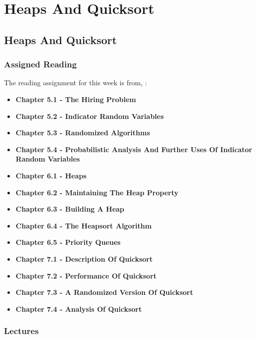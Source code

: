 \clearpage

\renewcommand{\ChapTitle}{Heaps And Quicksort}
\renewcommand{\SectionTitle}{Heaps And Quicksort}

\chapter{\ChapTitle}

\section{\SectionTitle}

\subsection{Assigned Reading}

The reading assignment for this week is from, \Textbook:

\begin{itemize}
    \item \textbf{Chapter 5.1 - The Hiring Problem}
    \item \textbf{Chapter 5.2 - Indicator Random Variables}
    \item \textbf{Chapter 5.3 - Randomized Algorithms}
    \item \textbf{Chapter 5.4 - Probabilistic Analysis And Further Uses Of Indicator Random Variables}
    \item \textbf{Chapter 6.1 - Heaps}
    \item \textbf{Chapter 6.2 - Maintaining The Heap Property}
    \item \textbf{Chapter 6.3 - Building A Heap}
    \item \textbf{Chapter 6.4 - The Heapsort Algorithm}
    \item \textbf{Chapter 6.5 - Priority Queues}
    \item \textbf{Chapter 7.1 - Description Of Quicksort}
    \item \textbf{Chapter 7.2 - Performance Of Quicksort}
    \item \textbf{Chapter 7.3 - A Randomized Version Of Quicksort}
    \item \textbf{Chapter 7.4 - Analysis Of Quicksort}
\end{itemize}

\subsection{Lectures}

